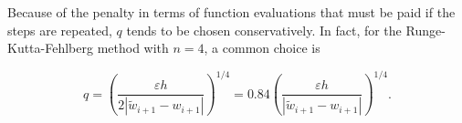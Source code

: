 Because of the penalty in terms of function evaluations that must be paid if the steps are repeated, $q$ tends to be chosen conservatively. In fact, for the Runge-Kutta-Fehlberg method with $n=4$, a common choice is

$$
q=\left(\frac{\varepsilon h}{2\left|\tilde{w}_{i+1}-w_{i+1}\right|}\right)^{1 / 4}=0.84\left(\frac{\varepsilon h}{\left|\tilde{w}_{i+1}-w_{i+1}\right|}\right)^{1 / 4} .
$$

%
%
%
%
%
%
%
